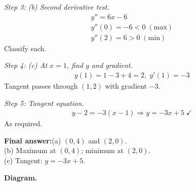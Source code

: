 \documentclass[11pt]{article}
\begin{document}
\textit{Step 3: (b) Second derivative test.}
\[\begin{gathered}
y'' = 6x - 6 \\ y''(0) = -6 < 0\; (\text{max}) \\ y''(2) = 6 > 0\; (\text{min})
\end{gathered}\]
Classify each.

\textit{Step 4: (c) At \( x = 1 \), find \( y \) and gradient.}
\[\begin{gathered}
y(1) = 1 - 3 + 4 = 2, \; y'(1) = -3
\end{gathered}\]
Tangent passes through \( (1, 2) \) with gradient \( -3 \).

\textit{Step 5: Tangent equation.}
\[\begin{gathered}
y - 2 = -3(x - 1) \Rightarrow y = -3x + 5 \;\checkmark
\end{gathered}\]
As required.

\begin{answerbox}
\textbf{Final answer:}\quad (a) \(\displaystyle  (0, 4) \) and \(\displaystyle  (2, 0) \). \\[3pt]  (b) Maximum at \(\displaystyle  (0, 4) \); minimum at \(\displaystyle  (2, 0) \). \\[3pt]  (c) Tangent: \(\displaystyle  y = -3x + 5 \).
\end{answerbox}
\textbf{Diagram.}
\end{document}
